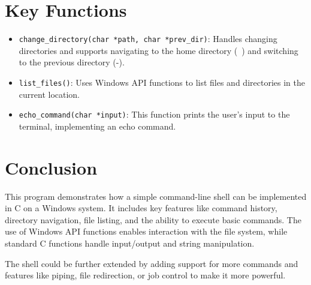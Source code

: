 \documentclass[conference]{IEEEtran}
\begin{document}
\section{Key Functions}
\begin{itemize}
\item \texttt{change\_directory(char *path, char *prev\_dir)}: Handles changing directories and supports navigating to the home directory (~) and switching to the previous directory (-).
\item \texttt{list\_files()}: Uses Windows API functions to list files and directories in the current location.
\item \texttt{echo\_command(char *input)}: This function prints the user's input to the terminal, implementing an echo command.
\end{itemize}

\section{Conclusion}
This program demonstrates how a simple command-line shell can be implemented in C on a Windows system. It includes key features like command history, directory navigation, file listing, and the ability to execute basic commands. The use of Windows API functions enables interaction with the file system, while standard C functions handle input/output and string manipulation.

The shell could be further extended by adding support for more commands and features like piping, file redirection, or job control to make it more powerful.

\end{document}
